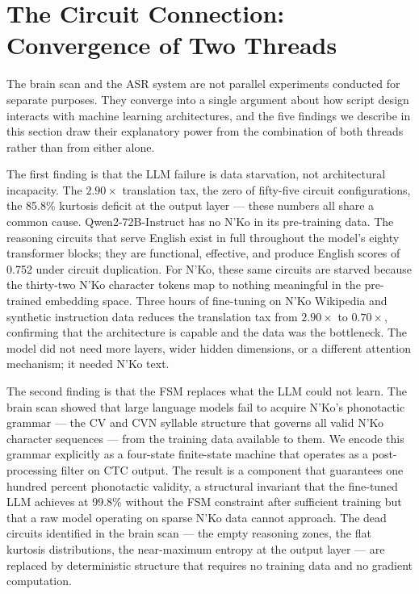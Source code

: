 \documentclass[11pt]{article}
\newcommand{\nko}{N'Ko}
\begin{document}
\section{The Circuit Connection: Convergence of Two Threads}
\label{sec:circuit_connection}

The brain scan and the ASR system are not parallel experiments conducted for separate purposes. They converge into a single argument about how script design interacts with machine learning architectures, and the five findings we describe in this section draw their explanatory power from the combination of both threads rather than from either alone.

The first finding is that the LLM failure is data starvation, not architectural incapacity. The $2.90\times$ translation tax, the zero of fifty-five circuit configurations, the 85.8\% kurtosis deficit at the output layer --- these numbers all share a common cause. Qwen2-72B-Instruct has no \nko{} in its pre-training data. The reasoning circuits that serve English exist in full throughout the model's eighty transformer blocks; they are functional, effective, and produce English scores of 0.752 under circuit duplication. For \nko{}, these same circuits are starved because the thirty-two \nko{} character tokens map to nothing meaningful in the pre-trained embedding space. Three hours of fine-tuning on \nko{} Wikipedia and synthetic instruction data reduces the translation tax from $2.90\times$ to $0.70\times$, confirming that the architecture is capable and the data was the bottleneck. The model did not need more layers, wider hidden dimensions, or a different attention mechanism; it needed \nko{} text.

The second finding is that the FSM replaces what the LLM could not learn. The brain scan showed that large language models fail to acquire \nko{}'s phonotactic grammar --- the CV and CVN syllable structure that governs all valid \nko{} character sequences --- from the training data available to them. We encode this grammar explicitly as a four-state finite-state machine that operates as a post-processing filter on CTC output. The result is a component that guarantees one hundred percent phonotactic validity, a structural invariant that the fine-tuned LLM achieves at 99.8\% without the FSM constraint after sufficient training but that a raw model operating on sparse \nko{} data cannot approach. The dead circuits identified in the brain scan --- the empty reasoning zones, the flat kurtosis distributions, the near-maximum entropy at the output layer --- are replaced by deterministic structure that requires no training data and no gradient computation.
\end{document}
